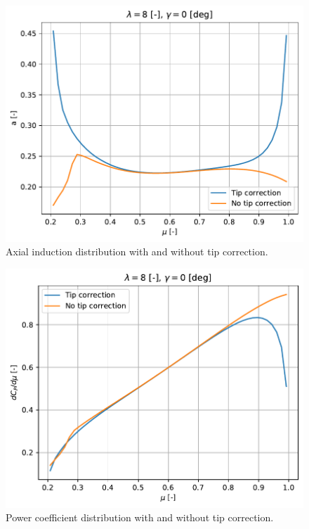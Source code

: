 \begin{figure}[htbp]
	\centering
	\includegraphics[height=0.45\textheight]{./img/tip-correction/a.pdf}
	\caption{Axial induction distribution with and without tip correction.}
	\label{img:tc-a}
\end{figure}

\begin{figure}[htbp]
	\centering
	\includegraphics[height=0.45\textheight]{./img/tip-correction/dcp_dmu.pdf}
	\caption{Power coefficient distribution with and without tip correction.}
	\label{img:tc-dcp-dmu}
\end{figure}

